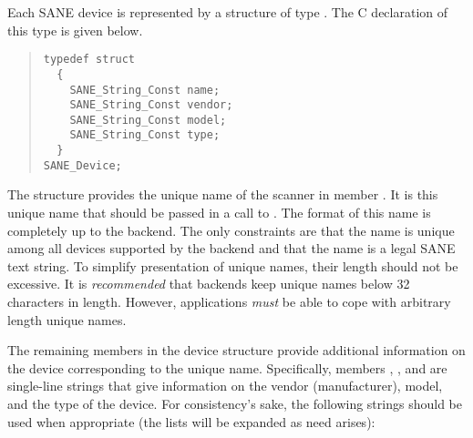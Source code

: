 \documentclass[11pt,DVIps]{report}
\begin{document}
Each SANE device is represented by a structure of type
.  The C declaration of this type is given
below.
\begin{quote}
\begin{verbatim}
typedef struct
  {
    SANE_String_Const name;
    SANE_String_Const vendor;
    SANE_String_Const model;
    SANE_String_Const type;
  }
SANE_Device;
\end{verbatim}
\end{quote}
The structure provides the unique name of the scanner in member
.  It is this unique name that should be passed in a call
to .  The format of this name is completely up to
the backend.  The only constraints are that the name is unique among
all devices supported by the backend and that the name is a legal SANE
text string.  To simplify presentation of unique names, their length
should not be excessive.  It is {\em recommended\/} that backends keep
unique names below 32 characters in length.  However, applications
{\em must\/} be able to cope with arbitrary length unique names.

The remaining members in the device structure provide additional
information on the device corresponding to the unique name.
Specifically, members , , and  are
single-line strings that give information on the vendor
(manufacturer), model, and the type of the device.  For consistency's
sake, the following strings should be used when appropriate (the lists
will be expanded as need arises):
\end{document}
